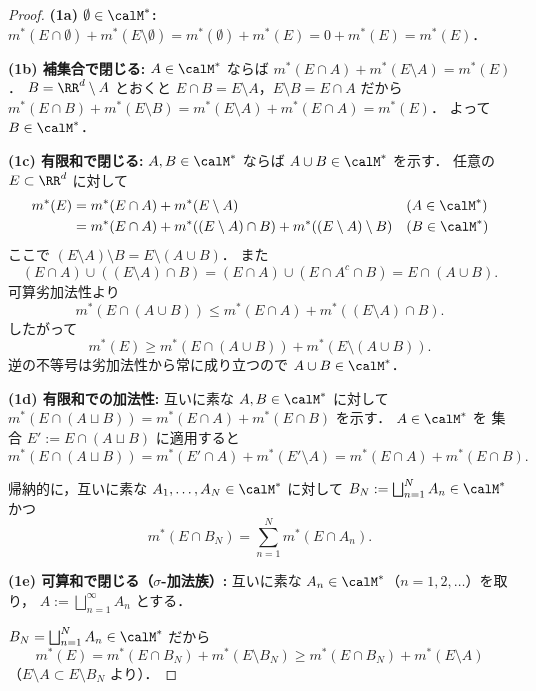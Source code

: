 \begin{proof}
\textbf{(1a) $\emptyset \in \calM^*$:}\quad
$m^*(E \cap \emptyset) + m^*(E \setminus \emptyset)
= m^*(\emptyset) + m^*(E)
= 0 + m^*(E) = m^*(E)$．

\textbf{(1b) 補集合で閉じる:}\quad
$A \in \calM^*$ ならば
$m^*(E \cap A) + m^*(E \setminus A) = m^*(E)$．
$B = \RR^d \setminus A$ とおくと
$E \cap B = E \setminus A$，$E \setminus B = E \cap A$ だから
$m^*(E \cap B) + m^*(E \setminus B)
= m^*(E \setminus A) + m^*(E \cap A) = m^*(E)$．
よって $B \in \calM^*$．

\textbf{(1c) 有限和で閉じる:}\quad
$A, B \in \calM^*$ ならば $A \cup B \in \calM^*$ を示す．
任意の $E \subset \RR^d$ に対して
\begin{align*}
m^*(E)
&= m^*(E \cap A) + m^*(E \setminus A)
&& (A \in \calM^*) \\
&= m^*(E \cap A) + m^*((E \setminus A) \cap B) + m^*((E \setminus A) \setminus B)
&& (B \in \calM^*)
\end{align*}
ここで $(E \setminus A) \setminus B = E \setminus (A \cup B)$．
また
\[
(E \cap A) \cup ((E \setminus A) \cap B)
= (E \cap A) \cup (E \cap A^c \cap B)
= E \cap (A \cup B).
\]
可算劣加法性より
\[
m^*(E \cap (A \cup B))
\le m^*(E \cap A) + m^*((E \setminus A) \cap B).
\]
したがって
\[
m^*(E) \ge m^*(E \cap (A \cup B)) + m^*(E \setminus (A \cup B)).
\]
逆の不等号は劣加法性から常に成り立つので
$A \cup B \in \calM^*$．

\textbf{(1d) 有限和での加法性:}\quad
互いに素な $A, B \in \calM^*$ に対して
$m^*(E \cap (A \sqcup B))
= m^*(E \cap A) + m^*(E \cap B)$ を示す．
$A \in \calM^*$ を
集合 $E' := E \cap (A \sqcup B)$ に適用すると
\[
m^*(E \cap (A \sqcup B))
= m^*(E' \cap A) + m^*(E' \setminus A)
= m^*(E \cap A) + m^*(E \cap B).
\]

帰納的に，互いに素な $A_1,\ldots,A_N \in \calM^*$ に対して
$B_N := \bigsqcup_{n=1}^N A_n \in \calM^*$ かつ
\begin{equation}\label{eq:finite-additivity}
m^*\!\left(E \cap B_N\right) = \sum_{n=1}^{N} m^*(E \cap A_n).
\end{equation}

\textbf{(1e) 可算和で閉じる（$\sigma$-加法族）:}\quad
互いに素な $A_n \in \calM^*$（$n = 1, 2, \ldots$）を取り，
$A := \bigsqcup_{n=1}^{\infty} A_n$ とする．

$B_N = \bigsqcup_{n=1}^N A_n \in \calM^*$ だから
\[
m^*(E)
= m^*(E \cap B_N) + m^*(E \setminus B_N)
\ge m^*(E \cap B_N) + m^*(E \setminus A)
\]
（$E \setminus A \subset E \setminus B_N$ より）．


\end{proof}
